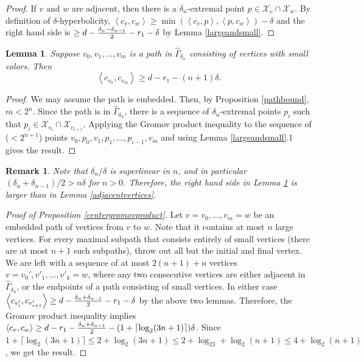 \documentclass[11pt,letterpaper]{amsart}
\newtheorem{lemma}[theorem]{Lemma}
\newtheorem*{remark}{Remark}
\begin{document}
\begin{proof}
If $v$ and $w$ are adjacent, then there is a $\delta_n$-extremal point $p\in\mathcal X_v\cap\mathcal X_w$. By definition of $\delta$-hyperbolicity, $\left<c_v,c_w\right>\geq \min(\left<c_v,p\right>,\left<p,c_w\right>)-\delta$ and the right hand side is $\geq d-{\delta_n-\delta_{n-1}\over 2}-r_1-\delta$ by Lemma \ref{largeandsmall}. 
\end{proof}
\begin{lemma}
\label{smallpath}
Suppose $v_0,v_1,\dots,v_m$ is a path in $\hat\Gamma_{\delta_n}$ consisting of vertices with small colors. Then 
$$
\left<c_{v_0},c_{v_m}\right>\geq d-r_1-(n+1)\delta.
$$
\end{lemma}
\begin{proof}
We may assume the path is embedded. Then, by Proposition \ref{pathbound}, $m<2^n$. Since the path is in $\hat\Gamma_{\delta_n}$, there is a sequence of $\delta_n$-extremal points $p_i$ such that $p_i\in\mathcal X_{v_i}\cap \mathcal X_{v_{i+1}}$. Applying the Gromov product inequality to the sequence of ($<2^{n+1}$) points $v_0,p_0,v_1,p_1,\dots,p_{i-1},v_m$ and using Lemma \ref{largeandsmall}.1 gives the result. 
\end{proof}
\begin{remark}
Note that $\delta_n/\delta$ is superlinear in $n$, and in particular $(\delta_n+\delta_{n-1})/2>n\delta$ for $n>0$. Therefore, the right hand side in Lemma \ref{smallpath} is larger than in Lemma \ref{adjacentvertices}. 
\end{remark}
\begin{proof}[Proof of Proposition \ref{centergromovproduct}]
Let $v=v_0,\dots,v_m=w$ be an embedded path of vertices from $v$ to $w$. Note that it contains at most $n$ large vertices. For every maximal subpath that consists entirely of small vertices (there are at most $n+1$ such subpaths), throw out all but the initial and final vertex. We are left with a sequence of at most $2(n+1)+n$ vertices $v=v_0',v'_1,\dots,v'_k=w$, where any two consecutive vertices are either adjacent in $\hat\Gamma_{\delta_{n}}$, or the endpoints of a path consisting of small vertices. In either case $\left<c_{v_i'},c_{v'_{i+1}}\right>\geq d-{\delta_n+\delta_{n-1}\over 2}-r_1-\delta$ by the above two lemmas. Therefore, the Gromov product inequality implies $\left<c_v,c_w\right>\geq d-r_1-{\delta_n+\delta_{n-1}\over 2}-(1+\lceil\log_2(3n+1)\rceil)\delta$. Since $1+\lceil\log_2(3n+1)\rceil\leq 2+\log_2(3n+1)\leq 2+\log_23+\log_2(n+1)\leq 4+\log_2(n+1)$, we get the result.
\end{proof}
\end{document}
